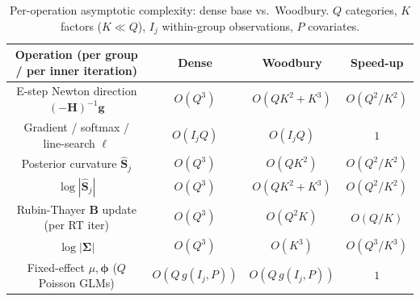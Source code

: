 \begin{table}[H]
\centering
\caption{Per-operation asymptotic complexity: dense base vs.\ Woodbury.
$Q$ categories, $K$ factors ($K\ll Q$), $I_j$ within-group observations, $P$ covariates.}
\label{tab:complexity-asymptotic}
\begin{tabular}{@{}cccc@{}}
\toprule
Operation (per group / per inner iteration) & Dense & Woodbury & Speed-up \\
\midrule
E-step Newton direction $(-\mathbf H)^{-1}\mathbf g$      & $O(Q^3)$   & $O(QK^2+K^3)$ & $O(Q^2/K^2)$ \\
Gradient / softmax / line-search $\ell$                   & $O(I_jQ)$  & $O(I_jQ)$     & $1$ \\
Posterior curvature $\widehat{\mathbf S}_j$              & $O(Q^3)$   & $O(QK^2)$     & $O(Q^2/K^2)$ \\
$\log|\widehat{\mathbf S}_j|$                            & $O(Q^3)$   & $O(QK^2+K^3)$ & $O(Q^2/K^2)$ \\
Rubin-Thayer $\mathbf B$ update (per RT iter)           & $O(Q^3)$   & $O(Q^2K)$     & $O(Q/K)$ \\
$\log|\bm\Sigma|$                                        & $O(Q^3)$   & $O(K^3)$      & $O(Q^3/K^3)$ \\
Fixed-effect $\mu,\bm\phi$ ($Q$ Poisson GLMs)            & $O(Q\,g(I_j,P))$ & $O(Q\,g(I_j,P))$ & $1$ \\
\bottomrule
\end{tabular}
\end{table}

